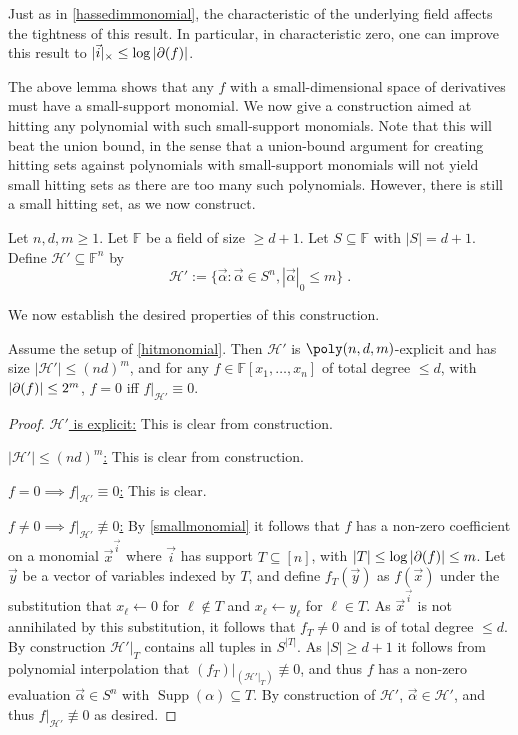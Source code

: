 \documentclass[letterpaper,11pt]{article}
\numberwithin{equation}{section}
\theoremstyle{plain}
\theoremstyle{remark}
\DeclareMathOperator{\supp}{Supp}
\newcommand{\F}{\mathbb{F}}
\newcommand{\cH}{\mathcal{H}}
\newcommand{\eqdef}{:=}
\begin{document}
Just as in \autoref{hassedimmonomial}, the characteristic of the underlying field affects the tightness of this result.  In particular, in characteristic zero, one can improve this result to $|\vec{i}|_\times\le\log|\partial(f)|$.

The above lemma shows that any $f$ with a small-dimensional space of derivatives must have a small-support monomial.  We now give a construction aimed at hitting any polynomial with such small-support monomials.  Note that this will beat the union bound, in the sense that a union-bound argument for creating hitting sets against polynomials with small-support monomials will not yield small hitting sets as there are too many such polynomials.  However, there is still a small hitting set, as we now construct.

\begin{construction}
	\label{hitmonomial}
	Let $n,d,m\ge 1$. Let $\F$ be a field of size $\ge d+1$. Let $S\subseteq\F$ with $|S|=d+1$. Define $\cH'\subseteq\F^n$ by
	\[
		\cH'\eqdef\{\vec{\alpha}:\vec{\alpha}\in S^n, |\vec{\alpha}|_0\le m\}\;.
	\]
\end{construction}

We now establish the desired properties of this construction.

\begin{theorem}
	\label{hitmonomialworks}
	Assume the setup of \autoref{hitmonomial}. Then $\cH'$ is $\poly(n,d,m)$-explicit and has size $|\cH'|\le (nd)^m$, and for any $f\in\F[x_1,\ldots,x_n]$ of total degree $\le d$, with $|\partial(f)|\le 2^m$, $f=0$ iff $f|_{\cH'}\equiv 0$.
\end{theorem}
\begin{proof}
	\uline{$\cH'$ is explicit:} This is clear from construction.

	\uline{$|\cH'|\le (nd)^m$:} This is clear from construction.

	\uline{$f=0 \implies f|_{\cH'}\equiv 0$:} This is clear.

	\uline{$f\ne 0 \implies f|_{\cH'}\not\equiv 0$:} By \autoref{smallmonomial} it follows that $f$ has a non-zero coefficient on a monomial $\vec{x}^{\vec{i}}$ where $\vec{i}$ has support $T\subseteq[n]$, with $|T|\le\log|\partial(f)|\le m$. Let $\vec{y}$ be a vector of variables indexed by $T$, and define $f_T(\vec{y})$ as $f(\vec{x})$ under the substitution that $x_\ell\leftarrow 0$ for $\ell\notin T$ and $x_\ell\leftarrow y_\ell$ for $\ell\in T$. As $\vec{x}^{\vec{i}}$ is not annihilated by this substitution, it follows that $f_T\ne0$ and is of total degree $\le d$.  By construction $\cH'|_T$ contains all tuples in $S^{|T|}$.  As $|S|\ge d+1$ it follows from polynomial interpolation that $(f_T)|_{(\cH'|_T)}\not\equiv0$, and thus $f$ has a non-zero evaluation $\vec{\alpha}\in S^n$ with $\supp(\alpha)\subseteq T$.  By construction of $\cH'$, $\vec{\alpha}\in\cH'$, and thus $f|_{\cH'}\not\equiv0$ as desired.
\end{proof}
\end{document}
